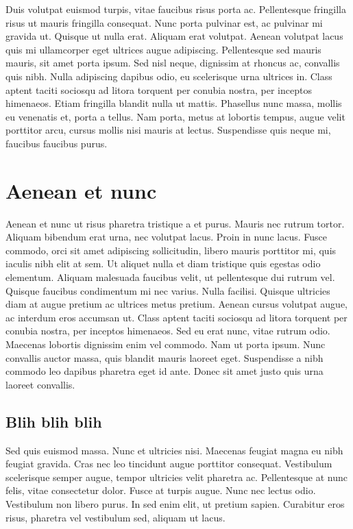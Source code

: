 Duis volutpat euismod turpis, vitae faucibus risus porta ac. Pellentesque fringilla risus ut mauris fringilla consequat. Nunc porta pulvinar est, ac pulvinar mi gravida ut. Quisque ut nulla erat. Aliquam erat volutpat. Aenean volutpat lacus quis mi ullamcorper eget ultrices augue adipiscing. Pellentesque sed mauris mauris, sit amet porta ipsum. Sed nisl neque, dignissim at rhoncus ac, convallis quis nibh. Nulla adipiscing dapibus odio, eu scelerisque urna ultrices in. Class aptent taciti sociosqu ad litora torquent per conubia nostra, per inceptos himenaeos. Etiam fringilla blandit nulla ut mattis. Phasellus nunc massa, mollis eu venenatis et, porta a tellus. Nam porta, metus at lobortis tempus, augue velit porttitor arcu, cursus mollis nisi mauris at lectus. Suspendisse quis neque mi, faucibus faucibus purus.

\section{Aenean et nunc}
\label{subsec:tbloc}

Aenean et nunc ut risus pharetra tristique a et purus. Mauris nec rutrum tortor. Aliquam bibendum erat urna, nec volutpat lacus. Proin in nunc lacus. Fusce commodo, orci sit amet adipiscing sollicitudin, libero mauris porttitor mi, quis iaculis nibh elit at sem. Ut aliquet nulla et diam tristique quis egestas odio elementum. Aliquam malesuada faucibus velit, ut pellentesque dui rutrum vel. Quisque faucibus condimentum mi nec varius. Nulla facilisi. Quisque ultricies diam at augue pretium ac ultrices metus pretium. Aenean cursus volutpat augue, ac interdum eros accumsan ut. Class aptent taciti sociosqu ad litora torquent per conubia nostra, per inceptos himenaeos. Sed eu erat nunc, vitae rutrum odio. Maecenas lobortis dignissim enim vel commodo. Nam ut porta ipsum. Nunc convallis auctor massa, quis blandit mauris laoreet eget. Suspendisse a nibh commodo leo dapibus pharetra eget id ante. Donec sit amet justo quis urna laoreet convallis.

\subsection{Blih blih blih} 
 
Sed quis euismod massa. Nunc et ultricies nisi. Maecenas feugiat magna eu nibh feugiat gravida. Cras nec leo tincidunt augue porttitor consequat. Vestibulum scelerisque semper augue, tempor ultricies velit pharetra ac. Pellentesque at nunc felis, vitae consectetur dolor. Fusce at turpis augue. Nunc nec lectus odio. Vestibulum non libero purus. In sed enim elit, ut pretium sapien. Curabitur eros risus, pharetra vel vestibulum sed, aliquam ut lacus.


